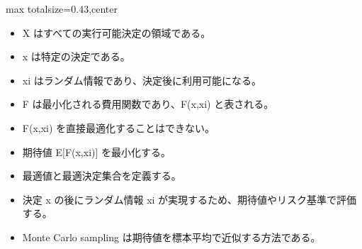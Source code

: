 \clearpage
{}
\begin{minipage}[t]{0.405\textwidth}
\begin{adjustbox}{max totalsize={\textwidth}{0.43\textheight},center}
\begin{minipage}{\textwidth}\scriptsize
{}\begin{itemize}
\item X はすべての実行可能決定の領域である。
\item x は特定の決定である。
\item xi はランダム情報であり、決定後に利用可能になる。
\item F は最小化される費用関数であり、F(x,xi) と表される。
\item F(x,xi) を直接最適化することはできない。
\item 期待値 E[F(x,xi)] を最小化する。
\item 最適値と最適決定集合を定義する。
\end{itemize}\begin{itemize}
\item 決定 x の後にランダム情報 xi が実現するため、期待値やリスク基準で評価する。
\item Monte Carlo sampling は期待値を標本平均で近似する方法である。
\end{itemize}
\end{minipage}
\end{adjustbox}
\end{minipage}\hfill
